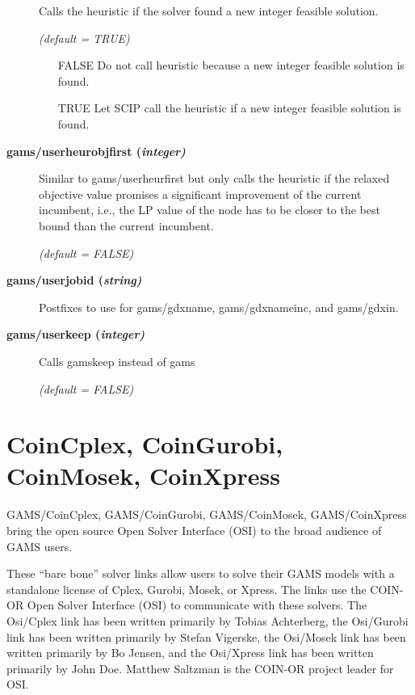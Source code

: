 \begin{description}
Calls the heuristic if the solver found a new integer feasible solution.

\textsl{(default = TRUE)}
\begin{itemize}
\item[FALSE] Do not call heuristic because a new integer feasible solution is found.
\item[TRUE] Let SCIP call the heuristic if a new integer feasible solution is found.
\end{itemize}

\item[\label{scipuserheurobjfirst}\hypertarget{scipuserheurobjfirst}
{\textbf{gams/userheurobjfirst (\slshape{integer})}}]\hspace{1.0in}

Similar to gams/userheurfirst but only calls the heuristic if the relaxed objective value promises a significant improvement of the current incumbent, i.e., the LP value of the node has to be closer to the best bound than the current incumbent.

\textsl{(default = FALSE)}

\item[\label{scipuserjobid}\hypertarget{scipuserjobid}
{\textbf{gams/userjobid (\slshape{string})}}]\hspace{1.0in}

Postfixes to use for gams/gdxname, gams/gdxnameinc, and gams/gdxin.


\item[\label{scipuserkeep}\hypertarget{scipuserkeep}
{\textbf{gams/userkeep (\slshape{integer})}}]\hspace{1.0in}

Calls gamskeep instead of gams

\textsl{(default = FALSE)}

\end{description}

\section{CoinCplex, CoinGurobi, CoinMosek, CoinXpress}

GAMS/CoinCplex, GAMS/CoinGurobi, GAMS/CoinMosek, GAMS/CoinXpress bring the open source Open Solver Interface (OSI) to the broad audience of GAMS users.

These ``bare bone'' solver links allow users to solve their GAMS models with a standalone license of Cplex, Gurobi, Mosek, or Xpress.
The links use the COIN-OR Open Solver Interface (OSI) to communicate with these solvers.
The Osi/Cplex link has been written primarily by Tobias Achterberg,
the Osi/Gurobi link has been written primarily by Stefan Vigerske,
the Osi/Mosek link has been written primarily by Bo Jensen, and
the Osi/Xpress link has been written primarily by John Doe.
Matthew Saltzman is the COIN-OR project leader for OSI.

